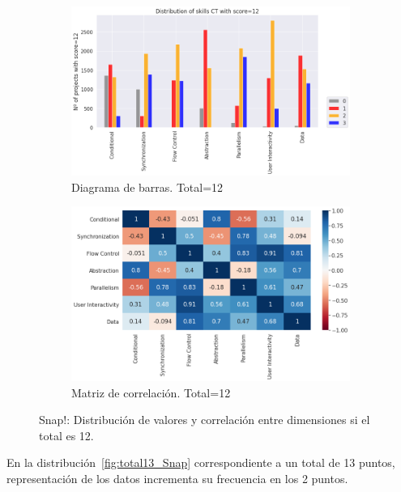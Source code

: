 \documentclass[a4paper, 12pt]{book}
\begin{document}
\begin{figure}[H]
    \centering
    \begin{subfigure}[h]{.49\textwidth} 
        \includegraphics[width=\textwidth]{img/distribucion_12_Snap}
        \caption{Diagrama de barras. Total=12}
        \label{fig:total12_Snap}
    \end{subfigure}       
    \begin{subfigure}[h]{.49\textwidth} 
        \includegraphics[width=\textwidth]{img/corr_12_Snap}
        \caption{Matriz de correlación. Total=12}
        \label{fig:corr12_Snap}
    \end{subfigure}
    \caption{Snap!: Distribución de valores y correlación entre dimensiones si el total es 12.}
\end{figure}

En la distribución~\ref{fig:total13_Snap} correspondiente a un total de 13 puntos, representación de los datos incrementa su frecuencia en los 2 puntos.
\end{document}
